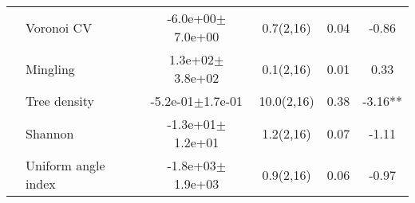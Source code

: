 \begin{table}[]
\begin{tabular}{llcccS[table-format=-2.2, table-space-text-post = {***}]}
   & Voronoi CV & -6.0e+00$\pm$7.0e+00 & 0.7(2,16) & 0.04 & -0.86 \\ 
   & Mingling &  1.3e+02$\pm$3.8e+02 & 0.1(2,16) & 0.01 & 0.33 \\ 
   & Tree density & -5.2e-01$\pm$1.7e-01 & 10.0(2,16) & 0.38 & -3.16** \\ 
   & Shannon & -1.3e+01$\pm$1.2e+01 & 1.2(2,16) & 0.07 & -1.11 \\ 
   & Uniform angle index & -1.8e+03$\pm$1.9e+03 & 0.9(2,16) & 0.06 & -0.97 \\ 
   \bottomrule
\end{tabular}
\end{table}

